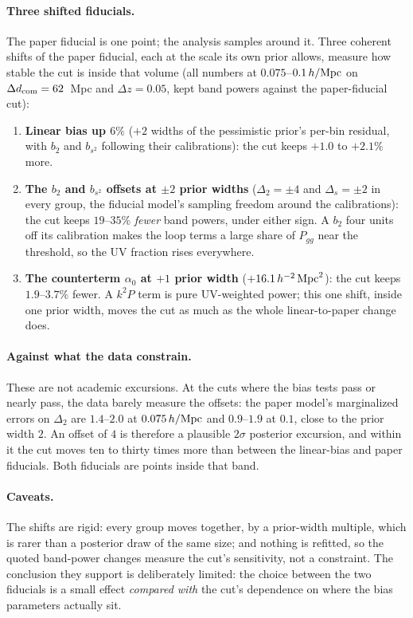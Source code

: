 \documentclass[11pt]{article}
\newcommand{\hMpc}{\,h/{\rm Mpc}}
\newcommand{\aunit}{\,h^{-2}\,{\rm Mpc}^2}
\newcommand{\dcom}{$\Delta d_{\rm com} = 62$~Mpc}
\begin{document}
\paragraph{Three shifted fiducials.}
The paper fiducial is one point; the analysis samples around it.
Three coherent shifts of the paper fiducial, each at the scale its
own prior allows, measure how stable the cut is inside that volume
(all numbers at $0.075$--$0.1\hMpc$ on \dcom{} and
$\Delta z = 0.05$, kept band powers against the paper-fiducial
cut):
\begin{enumerate}
  \item \textbf{Linear bias up $6\%$} ($+2$ widths of the
    pessimistic prior's per-bin residual, with $b_2$ and $b_{s^2}$
    following their calibrations): the cut keeps $+1.0$ to $+2.1\%$
    more.
  \item \textbf{The $b_2$ and $b_{s^2}$ offsets at $\pm 2$ prior
    widths} ($\Delta_2 = \pm 4$ and $\Delta_s = \pm 2$ in every
    group, the fiducial model's sampling freedom around the
    calibrations):
    the cut keeps $19$--$35\%$ \emph{fewer} band powers, under
    either sign.  A $b_2$ four units off its calibration makes the
    loop terms a large share of $P_{gg}$ near the threshold, so the
    UV fraction rises everywhere.
  \item \textbf{The counterterm $\alpha_0$ at $+1$ prior width}
    ($+16.1\aunit$): the cut keeps $1.9$--$3.7\%$ fewer.  A
    $k^2 P$ term is pure UV-weighted power; this one shift, inside
    one prior width, moves the cut as much as the whole
    linear-to-paper change does.
\end{enumerate}

\paragraph{Against what the data constrain.}
These are not academic excursions.  At the cuts where the bias tests
pass or nearly pass, the data barely measure the offsets: the paper
model's marginalized errors on $\Delta_2$ are $1.4$--$2.0$ at
$0.075\hMpc$ and $0.9$--$1.9$ at $0.1$, close to the prior width
$2$.  An offset of $4$ is therefore a plausible $2\sigma$ posterior
excursion, and within it the cut moves ten to thirty times more
than between the linear-bias and paper fiducials.  Both fiducials
are points inside that band.

\paragraph{Caveats.}
The shifts are rigid: every group moves together, by a prior-width
multiple, which is rarer than a posterior draw of the same size; and
nothing is refitted, so the quoted band-power changes measure the
cut's sensitivity, not a constraint.  The conclusion they support is
deliberately limited: the choice between the two fiducials is a
small effect \emph{compared with} the cut's dependence on where the
bias parameters actually sit.
\end{document}
